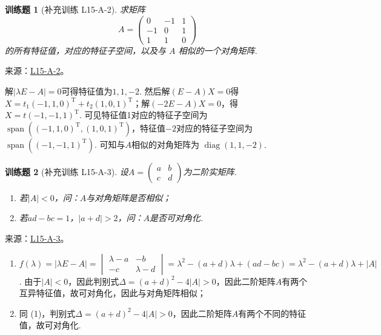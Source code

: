 \documentclass[12pt,fontset=fandol]{ctexart}
\newtheorem{exercise}{训练题}[section]
\begin{document}
\begin{exercise}[补充训练 L15-A-2]\label{prob:L15-A-2}
求矩阵
        \[A = \begin{pmatrix}
                0  & -1 & 1 \\
                -1 & 0  & 1 \\
                1  & 1  & 0
            \end{pmatrix}\]
        的所有特征值，对应的特征子空间，以及与 $A$ 相似的一个对角矩阵.
\end{exercise}
\noindent 来源：\href{https://github.com/yhwu-is/Linear-Algebra-Left-Undone/blob/new/%E8%AE%B2%E4%B9%89/%E4%B8%93%E9%A2%98/15%20%E7%9B%B8%E4%BC%BC%E6%A0%87%E5%87%86%E5%BD%A2%EF%BC%9A%E5%A4%8D%E6%95%B0%E5%9F%9F%E4%B8%8A%E7%9A%84%E5%B0%9D%E8%AF%95%E4%B8%8E%E7%90%86%E8%AE%BA.tex}{L15-A-2}。
\begin{solve}
解$|\lambda E-A|=0$可得特征值为$1,1,-2$. 然后解$(E-A)X=0$得$X=t_1(-1,1,0)^\mathrm{T}+t_2(1,0,1)^\mathrm{T}$；解$(-2E-A)X=0$，得$X=t(-1,-1,1)^\mathrm{T}$. 可见特征值1对应的特征子空间为$\operatorname{span}((-1,1,0)^\mathrm{T},(1,0,1)^\mathrm{T})$，特征值$-2$对应的特征子空间为 $\operatorname{span}((-1,-1,1)^\mathrm{T})$. 可知与$A$相似的对角矩阵为 $\operatorname{diag}(1,1,-2)$.
\end{solve}

\begin{exercise}[补充训练 L15-A-3]\label{prob:L15-A-3}
设$A=\begin{pmatrix}
                a & b \\ c & d
            \end{pmatrix}$为二阶实矩阵.
        \begin{enumerate}
            \item 若$|A|<0$，问：$A$与对角矩阵是否相似；

            \item 若$ad-bc=1$，$|a+d|>2$，问：$A$是否可对角化.
        \end{enumerate}
\end{exercise}
\noindent 来源：\href{https://github.com/yhwu-is/Linear-Algebra-Left-Undone/blob/new/%E8%AE%B2%E4%B9%89/%E4%B8%93%E9%A2%98/15%20%E7%9B%B8%E4%BC%BC%E6%A0%87%E5%87%86%E5%BD%A2%EF%BC%9A%E5%A4%8D%E6%95%B0%E5%9F%9F%E4%B8%8A%E7%9A%84%E5%B0%9D%E8%AF%95%E4%B8%8E%E7%90%86%E8%AE%BA.tex}{L15-A-3}。
\begin{solve}
\begin{enumerate}
                \item $f(\lambda)=|\lambda E-A|=\begin{vmatrix}
                              \lambda-a & -b \\ -c & \lambda-d
                          \end{vmatrix}=\lambda^2-(a+d)\lambda+(ad-bc)=\lambda^2-(a+d)\lambda+|A|$. 由于$|A|<0$，因此判别式$\Delta=(a+d)^2-4|A|>0$，因此二阶矩阵$A$有两个互异特征值，故可对角化，因此与对角矩阵相似；

                \item 同 (1)，判别式$\Delta=(a+d)^2-4|A|>0$，因此二阶矩阵$A$有两个不同的特征值，故可对角化.
            \end{enumerate}
\end{solve}
\end{document}
